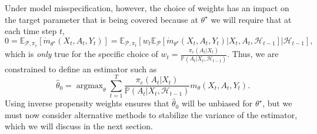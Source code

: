 \documentclass[11pt]{article}
\newcommand{\E}{\mathbb{E}}
\DeclareMathOperator*{\argmax}{argmax}
\begin{document}

Under model misspecification, however, the choice of weights has an impact on the target parameter that is being covered because at $\theta^{\star}$ we will require that at each time step $t$,
$$ 0 = \E_{\mathcal{P},\pi_{e}}\left[ \dot{m}_{\theta^{\star}}(X_{t},A_{t},Y_{t})\right] =\E_{\mathcal{P},\pi_{t}}\left[ w_{t}\E_{\mathcal{P}}\left[\dot{m}_{\theta^{\star}}(X_{t},A_{t},Y_{t}) | X_{t},A_{t}, \mathcal{H}_{t-1}\right]|\mathcal{H}_{t-1}\right],$$
which is \emph{only} true for the specific choice of $w_{t} = \frac{\pi_{e}(A_{t} | X_{t})}{ \mathbb{P} (A_{t}  | X_{t}, \mathcal{H}_{t-1}) }$. Thus, we are constrained to define an estimator such as
\begin{equation} \label{eqn:hat-theta-naive} 
\hat{\theta}_{0} =  \argmax_{\theta} \sum_{t=1}^{T}  \frac{\pi_{e}(A_{t} | X_{t})}{ \mathbb{P} (A_{t}  | X_{t}, \mathcal{H}_{t-1}) } m_{\theta}(X_{t},A_{t},Y_{t}).
\end{equation}
Using inverse propensity weights ensures that $\hat{\theta}_{0}$ will be unbiased for $\theta^{\star}$, but we must now consider alternative methods to stabilize the variance of the estimator, which we will discuss in the next section. 
\end{document}
